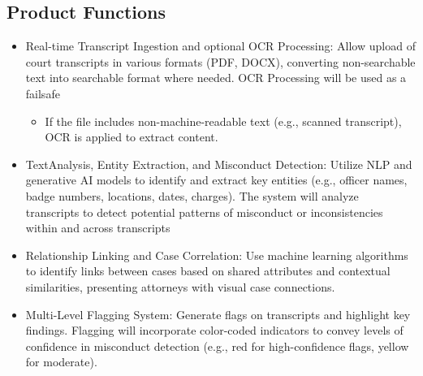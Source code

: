 \documentclass[12pt]{article}
\begin{document}
\subsection{Product Functions}
\begin{itemize}
  \item  Real-time Transcript Ingestion and optional OCR Processing: Allow upload of court
 transcripts in various formats (PDF, DOCX), converting non-searchable text into searchable
 format where needed. OCR Processing will be used as a failsafe
	\begin{itemize}
	\item     If the file includes non-machine-readable text (e.g., scanned transcript), OCR is applied to extract content.
	\end{itemize}

  \item TextAnalysis, Entity Extraction, and Misconduct Detection: Utilize NLP and generative AI
 models to identify and extract key entities (e.g., officer names, badge numbers, locations,
 dates, charges). The system will analyze transcripts to detect potential patterns of misconduct
 or inconsistencies within and across transcripts

  \item Relationship Linking and Case Correlation: Use machine learning algorithms to identify
 links between cases based on shared attributes and contextual similarities, presenting
 attorneys with visual case connections.

  \item  Multi-Level Flagging System: Generate flags on transcripts and highlight key findings.
 Flagging will incorporate color-coded indicators to convey levels of confidence in
 misconduct detection (e.g., red for high-confidence flags, yellow for moderate).
\end{itemize}
\end{document}
